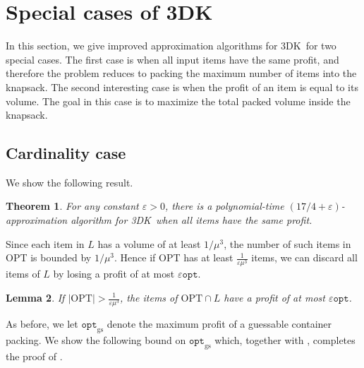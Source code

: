 \documentclass[10pt,a4paper]{amsart}
\newcommand{\eps}{\varepsilon}
\renewcommand{\epsilon}{\varepsilon} %
\newcommand{\tdk}{\textsc{3DK}}
\newtheorem{theorem}{Theorem}[section]
\newtheorem{lemma}[theorem]{Lemma}
\theoremstyle{definition}
\newcommand{\alg}{\mathtt{opt}_{\mathrm{gs}}}
\newcommand{\opt}{\mathtt{opt}}
\newcommand{\OPT}{\mathrm{OPT}}
\begin{document}

\section{Special cases of \tdk}
In this section, we give improved approximation algorithms for \tdk~for two special cases. The first case is when all input items have the same profit, and therefore the problem reduces to packing the maximum number of items into the knapsack. The second interesting case is when the profit of an item is equal to its volume. The goal in this case is to maximize the total packed volume inside the knapsack.

\subsection{Cardinality case}
\label{sec:nonrot-cardinality}
We show the following result.

\begin{theorem}
    \label{thm:3dkc}
   For any constant $\eps>0$, there is a polynomial-time $(17/4 +\eps)$-approximation algorithm for \tdk~when all items have the same profit. 
\end{theorem}

Since each item in $L$ has a volume of at least $1/\mu^3$, the number of such items in OPT is bounded by $1/\mu^3$. Hence if OPT has at least $\frac{1}{\epsilon\mu^3}$ items, we can discard all items of $L$ by losing a profit of at most $\epsilon \opt$.

\begin{lemma}
\label{lem:largedelete}
    If $|\OPT|> \frac{1}{\epsilon\mu^3}$, the items of $\OPT\cap L$ have a profit of at most $\epsilon \opt$. 
\end{lemma}


As before, we let $\alg$ denote the maximum profit of a guessable container packing. We show the following bound on $\alg$ which, together with , completes the proof of .
\end{document}
